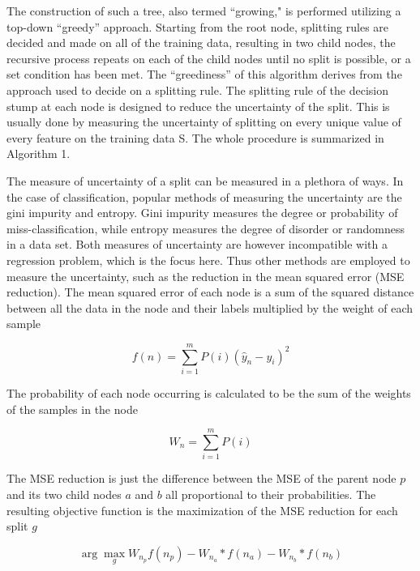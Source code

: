 \documentclass{article}
\begin{document}
The construction of such a tree, also termed “growing," is performed utilizing a top-down “greedy” approach. Starting from the root node, splitting rules are decided and made on all of the training data, resulting in two child nodes, the recursive process repeats on each of the child nodes until no split is possible, or a set condition has been met. The “greediness” of this algorithm derives from the approach used to decide on a splitting rule. The splitting rule of the decision stump at each node is designed to reduce the uncertainty of the split. This is usually done by measuring the uncertainty of splitting on every unique value of every feature on the training data S. The whole procedure is summarized in Algorithm 1.

The measure of uncertainty of a split can be measured in a plethora of ways. In the case of classification, popular methods of measuring the uncertainty are the gini impurity and entropy. Gini impurity measures the degree or probability of miss-classification, while entropy measures the degree of disorder or randomness in a data set. Both measures of uncertainty are however incompatible with a regression problem, which is the focus here. Thus other methods are employed to measure the uncertainty, such as the reduction in the mean squared error (MSE reduction). The mean squared error of each node is a sum of the squared distance between all the data in the node and their labels multiplied by the weight of each sample

\begin{equation}
f(n) = \sum_{i=1}^m{P(i)(\hat{y}_{n} - y_{i})^2}
\end{equation}

The probability of each node occurring is calculated to be the sum of the weights of the samples in the node

\begin{equation}
W_{n} = \sum_{i=1}^m{P(i)}
\end{equation}

The MSE reduction is just the difference between the MSE of the parent node \(p\) and its two child nodes \(a\) and \(b\) all proportional to their probabilities. The resulting objective function is the maximization of the MSE reduction for each split \(g\)

\begin{equation}
\arg \max_{g}   W_{n_{p}}f(n_{p}) - W_{n_{a}}*f(n_{a}) - W_{n_{b}}*f(n_{b})
\end{equation}
\end{document}
